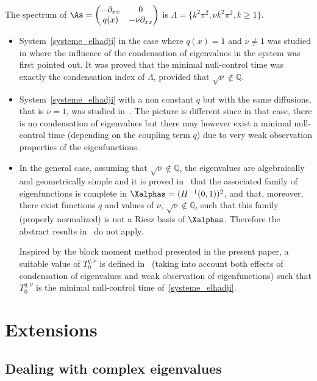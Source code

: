 The spectrum of $\As=
\begin{pmatrix} -\partial_{xx} & 0 \\ q(x) & -\nu \partial_{xx}
\end{pmatrix}$ is $\Lambda = \{ k^2 \pi^2 , \nu k^2 \pi^2, k\geq 1 \}$.
\begin{itemize}
\item System~\eqref{systeme_elhadji} in the case where $q(x)=1$ and $\nu\neq 1$ was studied in\linebreak \cite{AmmarKhodjaBenabdallahGonzalez-BurgosdeTeresa:2014} where the influence of the condensation of eigenvalues in the system was first pointed out. It was proved that the minimal null-control time was exactly the condensation index of $\Lambda$, provided that $\sqrt{\nu}\not\in \mathbb Q$.
\item System~\eqref{systeme_elhadji} with a non constant $q$ but with the same diffusions, that is $\nu=1$, was studied in~\cite{AKBGBdT_JMAA16}. The picture is different since in that case, there is no condensation of eigenvalues but there may however exist a minimal null-control time (depending on the coupling term $q$) due to very weak observation properties of the eigenfunctions.
\item In the general case, assuming that $\sqrt{\nu}\not\in \mathbb Q$, the eigenvalues are algebraically and geometrically simple and it is proved in~\cite{Samb18} that the associated family of eigenfunctions is complete in $\Xalphas=(H^{-1}(0,1))^2$, and that, moreover, there exist functions $q$ and values of $\nu$, $\sqrt{\nu}\not\in \mathbb Q$, such that this family (properly normalized) is not a Riesz basis of $\Xalphas$. Therefore the abstract results in~\cite{AmmarKhodjaBenabdallahGonzalez-BurgosdeTeresa:2014,AKBGBdT_JMAA16} do not apply.

Inspired by the block moment method presented in the present paper, a suitable value of $T_0^{q,\nu}$ is defined in~\cite{Samb18} (taking into account both effects of condensation of eigenvalues and weak observation of eigenfunctions) such that $T_0^{q,\nu}$ is the minimal null-control time of~\eqref{systeme_elhadji}.
\end{itemize}



\section{Extensions} \label{Sec:Extensions}


\subsection{Dealing with complex eigenvalues} \label{Subsec:ValeurPropresComplexes}


